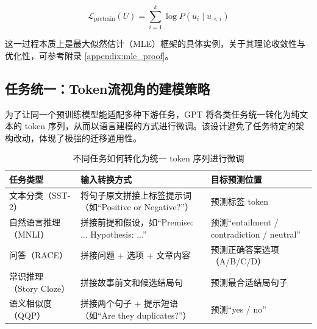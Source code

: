 \documentclass[a4paper,12pt]{article}
\begin{document}
\[
\mathcal{L}_{\text{pretrain}}(U) = \sum_{i=1}^{k} \log P(u_i \mid u_{<i})
\]

这一过程本质上是最大似然估计（MLE）框架的具体实例，关于其理论收敛性与优化性，可参考附录 \ref{appendix:mle_proof}。

\subsection{任务统一：Token流视角的建模策略}

为了让同一个预训练模型能适配多种下游任务，GPT 将各类任务统一转化为纯文本的 token 序列，从而以语言建模的方式进行微调。该设计避免了任务特定的架构改动，体现了极强的迁移通用性。

\begin{table}[H]
    \centering
    \caption{不同任务如何转化为统一 token 序列进行微调}
    \label{tab:task_unification}
    \begin{tabularx}{\textwidth}{|l|X|X|}
        \hline
        \textbf{任务类型} & \textbf{输入转换方式} & \textbf{目标预测位置} \\
        \hline
        文本分类（SST-2） & 将句子原文拼接上标签提示词（如“Positive or Negative?”） & 预测标签 token \\
        \hline
        自然语言推理（MNLI） & 拼接前提和假设，如“Premise: ... Hypothesis: ...” & 预测“entailment / contradiction / neutral” \\
        \hline
        问答（RACE） & 拼接问题 + 选项 + 文章内容 & 预测正确答案选项（A/B/C/D） \\
        \hline
        常识推理（Story Cloze） & 拼接故事前文和候选结局句 & 预测最合适结局句子 \\
        \hline
        语义相似度（QQP） & 拼接两个句子 + 提示短语（如“Are they duplicates?”） & 预测“yes / no” \\
        \hline
    \end{tabularx}
\end{table}
\end{document}
